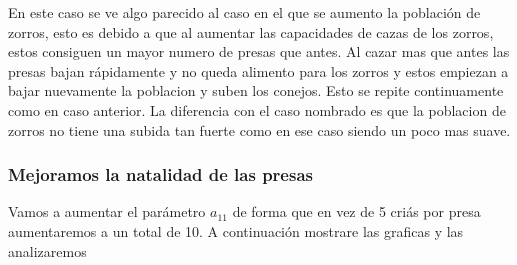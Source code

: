 \documentclass[]{article}
\begin{document}
\begin{figure}[H]
	\centering

\end{figure}

En este caso se ve algo parecido al caso en el que se aumento la población de zorros, esto es debido a que al aumentar las capacidades de cazas de los zorros, estos consiguen un mayor numero de presas que antes. Al cazar mas que antes las presas bajan rápidamente y no queda alimento para los zorros y estos empiezan a bajar nuevamente la poblacion y suben los conejos. Esto se repite continuamente como en caso anterior. La diferencia con el caso nombrado es que la poblacion de zorros no tiene una subida tan fuerte como en ese caso siendo un poco mas suave. 
\newpage
\subsubsection{Mejoramos la natalidad de las presas}
Vamos a aumentar el parámetro $a_{11}$ de forma que en vez de 5 criás por presa aumentaremos a un total de 10. A continuación mostrare las graficas y las analizaremos
\end{document}
